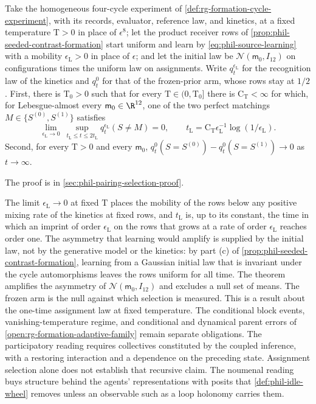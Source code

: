 Take the homogeneous four-cycle experiment of
\cref{def:rg-formation-cycle-experiment}, with its records, evaluator, reference
law, and kinetics, at a fixed temperature \(\mathrm T>0\) in place of
\(\epsilon^8\); let the product receiver rows of
\cref{prop:phil-seeded-contrast-formation} start uniform and learn by
\cref{eq:phil-source-learning} with a mobility \(\epsilon_{\mathrm L}>0\) in
place of \(\epsilon\); and let the initial law be
\(\mathcal N(\mathsf m_0,I_{12})\) on configurations times the uniform law on
assignments. Write \(q^{\epsilon_{\mathrm L}}_t\) for the recognition law of the
kinetics and \(q^0_t\) for that of the frozen-prior arm, whose rows stay at
\(1/2\). First, there is \(\mathrm T_0>0\) such
that for every \(\mathrm T\in(0,\mathrm T_0]\) there is
\(\mathrm C_{\mathrm T}<\infty\) for which, for Lebesgue-almost every
\(\mathsf m_0\in\R^{12}\), one of the two perfect matchings
\(M\in\{S^{(0)},S^{(1)}\}\) satisfies
\[
\lim_{\epsilon_{\mathrm L}\to0}\ \sup_{t_{\mathrm L}\le t\le2t_{\mathrm L}}
q^{\epsilon_{\mathrm L}}_t(S\ne M)=0,
\qquad
t_{\mathrm L}=\mathrm C_{\mathrm T}\epsilon_{\mathrm L}^{-1}\log(1/\epsilon_{\mathrm L}).
\]
Second, for every \(\mathrm T>0\) and every \(\mathsf m_0\),
\(q^0_t(S=S^{(0)})-q^0_t(S=S^{(1)})\to0\) as \(t\to\infty\).

The proof is in \cref{sec:phil-pairing-selection-proof}.

The limit \(\epsilon_{\mathrm L}\to0\) at fixed \(\mathrm T\) places the
mobility of the rows below any positive mixing rate of the kinetics at fixed
rows, and \(t_{\mathrm L}\) is, up to its constant, the time in which an imprint
of order \(\epsilon_{\mathrm L}\) on the rows that grows at a rate of order
\(\epsilon_{\mathrm L}\) reaches order one. The asymmetry that learning would
amplify is supplied by the initial law, not by the generative model or the
kinetics: by part (c) of \cref{prop:phil-seeded-contrast-formation}, learning
from a Gaussian initial law that is invariant under the cycle automorphisms
leaves the rows uniform for all time. The theorem amplifies the asymmetry of
\(\mathcal N(\mathsf m_0,I_{12})\) and excludes a null set of means. The frozen
arm is the null against which selection is measured. This is a result about
the one-time assignment law at fixed temperature. The conditional block
events, vanishing-temperature regime, and conditional and dynamical parent
errors of \cref{open:rg-formation-adaptive-family} remain separate obligations.
The participatory reading requires collectives constituted by the coupled
inference, with a restoring interaction and a dependence on the preceding
state. Assignment selection alone does not establish that recursive claim. The noumenal reading buys structure behind the
agents' representations with posits that \cref{def:phil-idle-wheel} removes
unless an observable such as a loop holonomy carries them.

